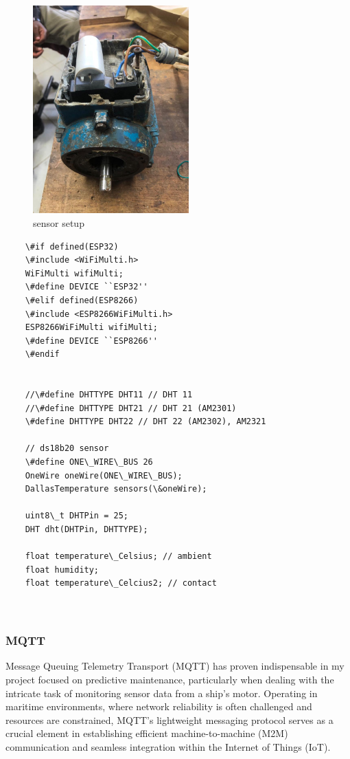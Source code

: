 \begin{figure}[!h]
	\centering
	\includegraphics[width=0.7\linewidth, height = 8cm]{Figures/motor.jpeg}
	\caption{sensor setup}
	
\end{figure}

\begin{lstlisting}
	\#if defined(ESP32)
	\#include <WiFiMulti.h>
	WiFiMulti wifiMulti;
	\#define DEVICE ``ESP32''
	\#elif defined(ESP8266)
	\#include <ESP8266WiFiMulti.h>
	ESP8266WiFiMulti wifiMulti;
	\#define DEVICE ``ESP8266''
	\#endif
	

	//\#define DHTTYPE DHT11 // DHT 11
	//\#define DHTTYPE DHT21 // DHT 21 (AM2301)
	\#define DHTTYPE DHT22 // DHT 22 (AM2302), AM2321
	
	// ds18b20 sensor
	\#define ONE\_WIRE\_BUS 26
	OneWire oneWire(ONE\_WIRE\_BUS);
	DallasTemperature sensors(\&oneWire);
	
	uint8\_t DHTPin = 25;
	DHT dht(DHTPin, DHTTYPE);
	
	float temperature\_Celsius; // ambient
	float humidity;
	float temperature\_Celcius2; // contact

	
\end{lstlisting}
	

\subsubsection{MQTT}

Message Queuing Telemetry Transport (MQTT) has proven indispensable in my project focused on predictive maintenance, particularly when dealing with the intricate task of monitoring sensor data from a ship's motor. Operating in maritime environments, where network reliability is often challenged and resources are constrained, MQTT's lightweight messaging protocol serves as a crucial element in establishing efficient machine-to-machine (M2M) communication and seamless integration within the Internet of Things (IoT).

